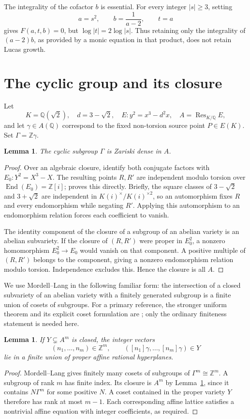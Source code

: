 \documentclass[11pt,a4paper]{article}
\newtheorem{lemma}[theorem]{Lemma}
\newcommand{\Q}{\mathbb Q}\newcommand{\Z}{\mathbb Z}
\DeclareMathOperator{\Res}{Res}
\begin{document}
The integrality of the cofactor $b$ is essential. For every integer
$|s|\ge3$, setting
\[
 a=s^2,\qquad b=\frac1{a-2},\qquad t=a
\]
gives $F(a,t,b)=0$, but $\log|t|=2\log|s|$.
Thus retaining only the integrality of $(a-2)b$, as provided by a
monic equation in that product, does not retain Lucas growth.

\section{The cyclic group and its closure}

Let
\[
 K=\Q(\sqrt2),\quad d=3-\sqrt2,\quad
 E:y^2=x^3-d^2x,\quad A=\Res_{K/\Q}E,
\]
and let $\gamma\in A(\Q)$ correspond to the fixed non-torsion source
point $P\in E(K)$. Set $\Gamma=\Z\gamma$.

\begin{lemma}\label{lem:densecyclic}
The cyclic subgroup $\Gamma$ is Zariski dense in $A$.
\end{lemma}
\begin{proof}
Over an algebraic closure, identify both conjugate factors with
$E_0:Y^2=X^3-X$. The resulting points $R,R'$ are independent
modulo torsion over $\operatorname{End}(E_0)=\Z[i]$;
\cite[Section 2]{Weighted} proves this directly. Briefly, the
square classes of $3-\sqrt2$ and $3+\sqrt2$ are independent in
$K(i)^\times/K(i)^{\times2}$, so an automorphism fixes $R$ and
every endomorphism while negating $R'$. Applying this automorphism
to an endomorphism relation forces each coefficient to vanish.

The identity component of the closure of a subgroup of an abelian
variety is an abelian subvariety. If the closure of $(R,R')$ were
proper in $E_0^2$, a nonzero homomorphism $E_0^2\to E_0$ would
vanish on that component. A positive multiple of $(R,R')$ belongs
to the component, giving a nonzero endomorphism relation modulo
torsion. Independence excludes this. Hence the closure is all $A$.
\end{proof}

We use Mordell--Lang in the following familiar form: the intersection
of a closed subvariety of an abelian variety with a finitely generated
subgroup is a finite union of cosets of subgroups. For a primary
reference, the stronger uniform theorem and its explicit coset
formulation are \cite[Theorem 1.1 and equation (1.1)]{GGK}; only the
ordinary finiteness statement is needed here.

\begin{lemma}\label{lem:lattices}
If $Y\subsetneq A^m$ is closed, the integer vectors
\[
 (n_1,\ldots,n_m)\in\Z^m,
 \qquad ([n_1]\gamma,\ldots,[n_m]\gamma)\in Y
\]
lie in a finite union of proper affine rational hyperplanes.
\end{lemma}
\begin{proof}
Mordell--Lang gives finitely many cosets of subgroups of
$\Gamma^m\cong\Z^m$. A subgroup of rank $m$ has finite index.
Its closure is $A^m$ by Lemma~\ref{lem:densecyclic}, since it
contains $N\Gamma^m$ for some positive $N$. A coset contained in
the proper variety $Y$ therefore has rank at most $m-1$.
Each corresponding affine lattice satisfies a nontrivial affine
equation with integer coefficients, as required.
\end{proof}
\end{document}
